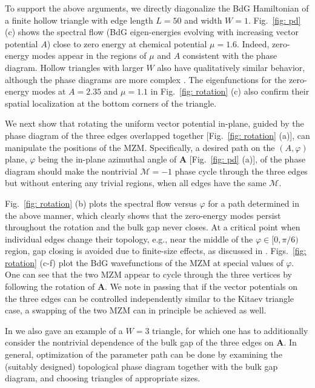 \documentclass[aps,prb,twocolumn,showpacs,amsmath,amssymb,superscriptaddress]{revtex4-2}
\begin{document}
To support the above arguments, we directly diagonalize the BdG Hamiltonian of a finite hollow triangle with edge length $L=50$ and width $W=1$. Fig.~\ref{fig: pd} (c) shows the spectral flow (BdG eigen-energies evolving with increasing vector potential $A$) close to zero energy at chemical potential $\mu=1.6$. Indeed, zero-energy modes appear in the regions of $\mu$ and $A$ consistent with the phase diagram. Hollow triangles with larger $W$ also have qualitatively similar behavior, although the phase diagrams are more complex \cite{supp}. The eigenfunctions for the zero-energy modes at $A=2.35$ and $\mu=1.1$ in Fig.~\ref{fig: rotation} (c) also confirm their spatial localization at the bottom corners of the triangle.

We next show that rotating the uniform vector potential in-plane, guided by the phase diagram of the three edges overlapped together [Fig.~\ref{fig: rotation} (a)], can manipulate the positions of the MZM. Specifically, a desired path on the $(A,\varphi)$ plane, $\varphi$ being the in-plane azimuthal angle of $\mathbf A$ [Fig.~\ref{fig: pd} (a)], of the phase diagram should make the nontrivial $\mathcal{M}=-1$ phase cycle through the three edges but without entering any trivial regions, when all edges have the same $\mathcal{M}$.

Fig.~\ref{fig: rotation} (b) plots the spectral flow versus $\varphi$ for a path determined in the above manner, which clearly shows that the zero-energy modes persist throughout the rotation and the bulk gap never closes. At a critical point when individual edges change their topology, e.g., near the middle of the $\varphi\in [0,\pi/6)$ region, gap closing is avoided due to finite-size effects, as discussed in \cite{aliceaNonAbelianStatisticsTopological2011}. Figs.~\ref{fig: rotation} (c-f) plot the BdG wavefunctions of the MZM at special values of $\varphi$. One can see that the two MZM appear to cycle through the three vertices by following the rotation of $\mathbf A$. We note in passing that if the vector potentials on the three edges can be controlled independently similar to the Kitaev triangle case, a swapping of the two MZM can in principle be achieved as well.

In \cite{supp} we also gave an example of a $W=3$ triangle, for which one has to additionally consider the nontrivial dependence of the bulk gap of the three edges on $\mathbf A$. In general, optimization of the parameter path can be done by examining the (suitably designed) topological phase diagram together with the bulk gap diagram, and choosing triangles of appropriate sizes.
\end{document}
